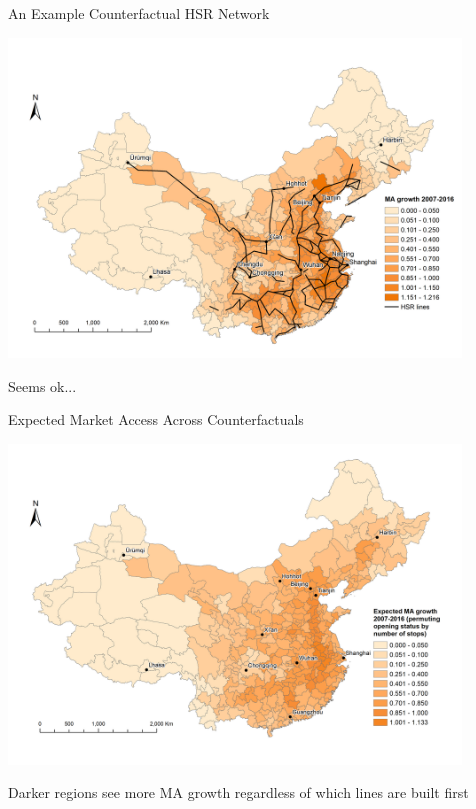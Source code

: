 \documentclass[11pt,english]{beamer}
\begin{document}
\begin{frame}{An Example Counterfactual HSR Network}

\begin{center}
	\includegraphics[width=0.9\textwidth]{figures/BH_sim_lines_MA_2016_color.png}
\end{center}

Seems ok... 

\end{frame}

\begin{frame}{Expected Market Access Across Counterfactuals}

\begin{center}
	\includegraphics[width=0.9\textwidth]{figures/NlinkExpected2016.png}
\end{center}

Darker regions see more MA growth regardless of which lines are built first

\end{frame}
\end{document}
